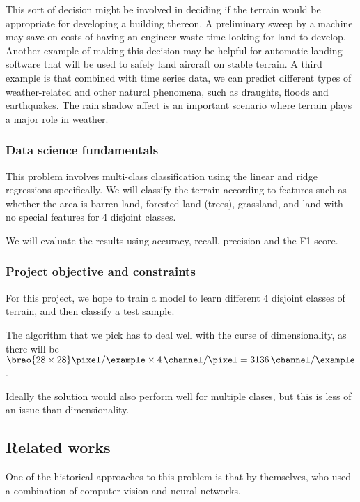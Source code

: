 \documentclass[11pt]{report}
\DeclarePairedDelimiter\brao()%
\begin{document}
This sort of decision might be involved in deciding if the terrain would be appropriate for developing a building thereon.
A preliminary sweep by a machine may save on costs of having an engineer waste time looking for land to develop.
Another example of making this decision may be helpful for automatic landing software that will be used to safely land aircraft on stable terrain.
A third example is that combined with time series data, we can predict different types
of weather-related and other natural phenomena,
such as draughts, floods and earthquakes.
The rain shadow affect is an important scenario where terrain plays a major role in weather.

\subsubsection{Data science fundamentals}

This problem involves multi-class classification
using the linear and ridge regressions specifically.
We will classify the terrain according to features such as whether the area is
barren land, forested land (trees), grassland, and land with no special features
for \(4\) disjoint classes.

We will evaluate the results using
accuracy, recall, precision and the F1 score.

\subsubsection{Project objective and constraints}

For this project, we hope to train a model to learn different \(4\) disjoint classes of terrain, and then classify a test sample.

The algorithm that we pick has to deal well with the curse of dimensionality,
as there will be
\(
    \SI[parse-numbers=false]{\brao{28\times28}\!}{\pixel\per\example}
    \times \SI4{\channel\per\pixel}
    = \SI{3136}{\channel\per\example}
\).

Ideally the solution would also perform well for multiple clases,
but this is less of an issue than dimensionality.

\subsection{Related works}

One of the historical approaches to this problem is that by \textcite{Basu2015a} themselves,
who
used a combination of computer vision and neural networks.
\end{document}
